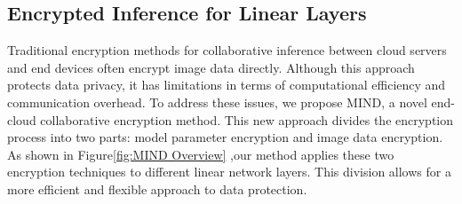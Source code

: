 \documentclass[conference]{IEEEtran}
\begin{document}



\subsection{Encrypted Inference for Linear Layers }
Traditional encryption methods for collaborative inference between cloud servers and end devices often encrypt image data directly. Although this approach protects data privacy, it has limitations in terms of computational efficiency and communication overhead. To address these issues, we propose MIND, a novel end-cloud collaborative encryption method. This new approach divides the encryption process into two parts: model parameter encryption and image data encryption. As shown in Figure\ref{fig:MIND Overview} ,our method applies these two encryption techniques to different linear network layers. This division allows for a more efficient and flexible approach to data protection.
\end{document}
